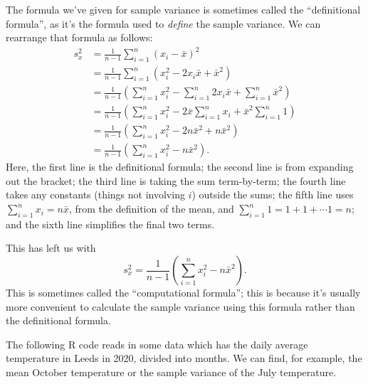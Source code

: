 \documentclass[
  a4paper,
]{book}
\newenvironment{Shaded}{\begin{snugshade}}{\end{snugshade}}
\newcommand{\FunctionTok}[1]{\textcolor[rgb]{0.00,0.00,0.00}{#1}}
\newcommand{\NormalTok}[1]{#1}
\newcommand{\OtherTok}[1]{\textcolor[rgb]{0.56,0.35,0.01}{#1}}
\newcommand{\SpecialCharTok}[1]{\textcolor[rgb]{0.00,0.00,0.00}{#1}}
\newcommand{\StringTok}[1]{\textcolor[rgb]{0.31,0.60,0.02}{#1}}
\theoremstyle{definition}
\theoremstyle{definition}
\theoremstyle{definition}
\theoremstyle{definition}
\theoremstyle{remark}
\begin{document}
The formula we've given for sample variance is sometimes called the ``definitional formula'', as it's the formula used to \emph{define} the sample variance. We can rearrange that formula as follows:
\begin{align*}
  s^2_x &= \frac{1}{n-1} \sum_{i=1}^n (x_i - \bar x)^2 \\
      &= \frac{1}{n-1} \sum_{i=1}^n (x_i^2 - 2x_i\bar x + \bar x^2) \\
      &= \frac{1}{n-1}\left(\sum_{i=1}^nx_i^2 - \sum_{i=1}^n 2x_i\bar x + \sum_{i=1}^n\bar x^2 \right) \\
      &= \frac{1}{n-1} \left(\sum_{i=1}^n x_i^2 - 2\bar x \sum_{i=1}^n x_i + \bar x^2 \sum_{i=1}^n 1 \right) \\
      &= \frac{1}{n-1} \left(\sum_{i=1}^n x_i^2 - 2n\bar x^2 + n\bar x^2 \right) \\
      &= \frac{1}{n-1} \left(\sum_{i=1}^n x_i^2 -  n\bar x^2 \right) .
\end{align*}
Here, the first line is the definitional formula; the second line is from expanding out the bracket; the third line is taking the sum term-by-term; the fourth line takes any constants (things not involving \(i\)) outside the sums; the fifth line uses \(\sum_{i=1}^n x_i = n\bar x\), from the definition of the mean, and \(\sum_{i=1}^n 1 = 1 + 1 + \cdots 1 = n\); and the sixth line simplifies the final two terms.

This has left us with
\[ s^2_x = \frac{1}{n-1} \left(\sum_{i=1}^n x_i^2 -  n\bar x^2 \right) . \]
This is sometimes called the ``computational formula''; this is because it's usually more convenient to calculate the sample variance using this formula rather than the definitional formula.

The following R code reads in some data which has the daily average temperature in Leeds in 2020, divided into months. We can find, for example, the mean October temperature or the sample variance of the July temperature.

\begin{Shaded}
\end{Shaded}
\end{document}
